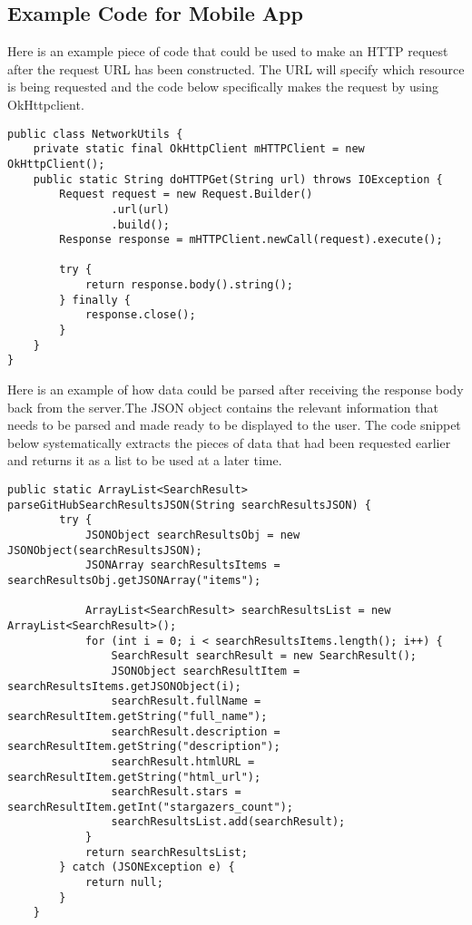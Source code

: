 \documentclass[onecolumn, draftclsnofoot,10pt, compsoc, tikz]{IEEEtran}
\begin{document}
\subsection{Example Code for Mobile App}

Here is an example piece of code that could be used to make an HTTP request after the request URL has been constructed. The URL will specify which resource is being requested and the code below specifically makes the request by using OkHttpclient.

\begin{lstlisting}
public class NetworkUtils {
    private static final OkHttpClient mHTTPClient = new OkHttpClient();
    public static String doHTTPGet(String url) throws IOException {
        Request request = new Request.Builder()
                .url(url)
                .build();
        Response response = mHTTPClient.newCall(request).execute();

        try {
            return response.body().string();
        } finally {
            response.close();
        }
    }
}

\end{lstlisting}

Here is an example of how data could be parsed after receiving the response body back from the server.The JSON object contains the relevant information that needs to be parsed and made ready to be displayed to the user. The code snippet below systematically extracts the pieces of data that had been requested earlier and returns it as a list to be used at a later time.

\begin{lstlisting}
public static ArrayList<SearchResult> parseGitHubSearchResultsJSON(String searchResultsJSON) {
        try {
            JSONObject searchResultsObj = new JSONObject(searchResultsJSON);
            JSONArray searchResultsItems = searchResultsObj.getJSONArray("items");

            ArrayList<SearchResult> searchResultsList = new ArrayList<SearchResult>();
            for (int i = 0; i < searchResultsItems.length(); i++) {
                SearchResult searchResult = new SearchResult();
                JSONObject searchResultItem = searchResultsItems.getJSONObject(i);
                searchResult.fullName = searchResultItem.getString("full_name");
                searchResult.description = searchResultItem.getString("description");
                searchResult.htmlURL = searchResultItem.getString("html_url");
                searchResult.stars = searchResultItem.getInt("stargazers_count");
                searchResultsList.add(searchResult);
            }
            return searchResultsList;
        } catch (JSONException e) {
            return null;
        }
    }
\end{lstlisting}
\end{document}
